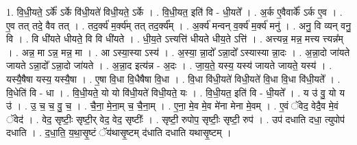 \documentclass[17pt]{extarticle}
\begin{document}
1. वि॒धी॒यते॒ ऽर्के᳚ ऽर्के वि॑धी॒यते॑ विधी॒यते॒ ऽर्के । . वि॒धी॒यत॒ इति॑ वि - धी॒यते᳚ । . अ॒र्क ए॒वैवार्के᳚ ऽर्क ए॒व । . ए॒व तत् तदे॒ वैव तत् । . तद॒र्क्य॑ म॒र्क्य॑म् तत् तद॒र्क्य᳚म् । . अ॒र्क्य॑ मन्वन् व॒र्क्य॑ म॒र्क्य॑ मनु॑ । . अनु॒ वि व्यन् वनु॒ वि । . वि धी॑यते धीयते॒ वि वि धी॑यते । . धी॒य॒ते ऽत्त्यत्ति॑ धीयते धीय॒ते ऽत्ति॑ । . अत्त्यन्न॒ मन्न॒ मत्त्य त्त्यन्न᳚म् । . अन्न॒ मा ऽन्न॒ मन्न॒ मा । . आ ऽस्या॒स्या ऽस्य॑ । . अ॒स्या॒ न्ना॒दो᳚ ऽन्ना॒दो᳚ ऽस्यास्या न्ना॒दः । . अ॒न्ना॒दो जा॑यते जायते ऽन्ना॒दो᳚ ऽन्ना॒दो जा॑यते । . अ॒न्ना॒द इत्य॑न्न - अ॒दः । . जा॒य॒ते॒ यस्य॒ यस्य॑ जायते जायते॒ यस्य॑ । . यस्यै॒षैषा यस्य॒ यस्यै॒षा । . ए॒षा वि॒धा वि॒धैषैषा वि॒धा । . वि॒धा वि॑धी॒यते॑ विधी॒यते॑ वि॒धा वि॒धा वि॑धी॒यते᳚ । . वि॒धेति॑ वि - धा । . वि॒धी॒यते॒ यो यो वि॑धी॒यते॑ विधी॒यते॒ यः । . वि॒धी॒यत॒ इति॑ वि - धी॒यते᳚ । . य उ॑ वु॒ यो य उ॑ । . उ॒ च॒ च॒ वु॒ च॒ । . चै॒ना॒ मे॒ना॒म् च॒ चै॒ना॒म् । . ए॒ना॒ मे॒व मे॒व मे॑ना मेना मे॒वम् । . ए॒वं ॅवेद॒ वेदै॒व मे॒वं ॅवेद॑ । . वेद॒ सृष्टीः॒ सृष्टी॒र् वेद॒ वेद॒ सृष्टीः᳚ । . सृष्टी॒ रुपोप॒ सृष्टीः॒ सृष्टी॒ रुप॑ । . उप॑ दधाति दधा॒ त्युपोप॑ दधाति । . द॒धा॒ति॒ य॒था॒सृ॒ष्टं ॅय॑थासृ॒ष्टम् द॑धाति दधाति यथासृ॒ष्टम् । \newline
\end{document}
